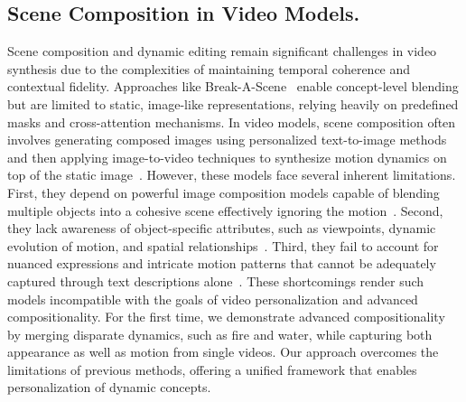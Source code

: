 \subsection{Scene Composition in Video Models.}
Scene composition and dynamic editing remain significant challenges in video synthesis due to the complexities of maintaining temporal coherence and contextual fidelity.
Approaches like Break-A-Scene~\cite{avrahami2023break} enable concept-level blending but are limited to static, image-like representations, relying heavily on predefined masks and cross-attention mechanisms.
In video models, scene composition often involves generating composed images using personalized text-to-image methods~\cite{qian2024omniidholisticidentityrepresentation,wang2024moamixtureofattentionsubjectcontextdisentanglement} and then applying image-to-video techniques to synthesize motion dynamics on top of the static image~\cite{chen2024videoalchemy, ren2024consisti2v,atomovideo,blattmann2023stable,dai2023animateanything,HaCohen2024LTXVideo}.
However, these models face several inherent limitations. First, they depend on powerful image composition models capable of blending multiple objects into a cohesive scene effectively ignoring the motion~\cite{blattmann2023stable,dai2023animateanything}. Second, they lack awareness of object-specific attributes, such as viewpoints, dynamic evolution of motion, and spatial relationships~\cite{blattmann2023stable,dai2023animateanything}.
Third, they fail to account for nuanced expressions and intricate motion patterns that cannot be adequately captured through text descriptions alone~\cite{dai2023animateanything,chen2024videoalchemy}.
These shortcomings render such models incompatible with the goals of video personalization and advanced compositionality.
For the first time, we demonstrate advanced compositionality by merging disparate dynamics, such as fire and water, while capturing both appearance as well as motion from single videos.
Our approach overcomes the limitations of previous methods, offering a unified framework that enables personalization of dynamic concepts.
